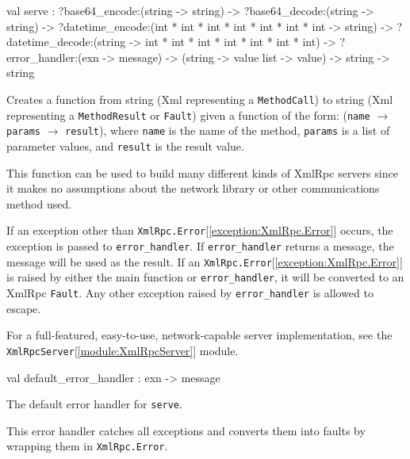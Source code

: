 \documentclass[11pt]{article}
\begin{document}
\label{val:XmlRpc.serve}\begin{ocamldoccode}
val serve :
  ?base64_encode:(string -> string) ->
  ?base64_decode:(string -> string) ->
  ?datetime_encode:(int * int * int * int * int * int * int -> string) ->
  ?datetime_decode:(string -> int * int * int * int * int * int * int) ->
  ?error_handler:(exn -> message) ->
  (string -> value list -> value) -> string -> string
\end{ocamldoccode}
\begin{ocamldocdescription}
Creates a function from string (Xml representing a {\tt{MethodCall}}) to
    string (Xml representing a {\tt{MethodResult}} or {\tt{Fault}}) given a function
    of the form: ({\tt{name}} $\rightarrow$ {\tt{params}} $\rightarrow$ {\tt{result}}), where {\tt{name}} is the
    name of the method, {\tt{params}} is a list of parameter values, and
    {\tt{result}} is the result value.


    This function can be used to build many different kinds of XmlRpc
    servers since it makes no assumptions about the network library
    or other communications method used.


    If an exception other than {\tt{XmlRpc.Error}}[\ref{exception:XmlRpc.Error}] occurs, the exception is
    passed to {\tt{error\_handler}}. If {\tt{error\_handler}} returns a message,
    the message will be used as the result. If an {\tt{XmlRpc.Error}}[\ref{exception:XmlRpc.Error}] is
    raised by either the main function or {\tt{error\_handler}}, it will be
    converted to an XmlRpc {\tt{Fault}}. Any other exception raised by
    {\tt{error\_handler}} is allowed to escape.


    For a full-featured, easy-to-use, network-capable server implementation,
    see the {\tt{XmlRpcServer}}[\ref{module:XmlRpcServer}] module.


\end{ocamldocdescription}




\label{val:XmlRpc.default-underscoreerror-underscorehandler}\begin{ocamldoccode}
val default_error_handler : exn -> message
\end{ocamldoccode}
\begin{ocamldocdescription}
The default error handler for {\tt{serve}}.


    This error handler catches all exceptions and converts them into
    faults by wrapping them in {\tt{XmlRpc.Error}}.


\end{ocamldocdescription}
\end{document}
